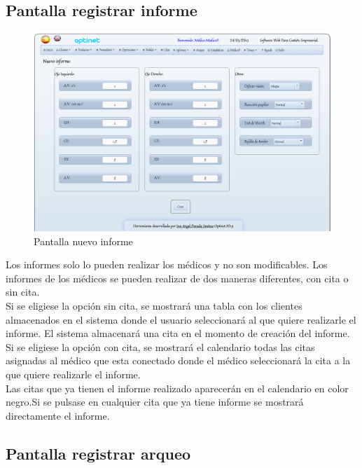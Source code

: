 \documentclass[a4paper,11pt]{book}
\begin{document}
\newpage
\subsection{Pantalla registrar informe}
\begin{figure}[!htb]
  \centering
    \includegraphics[scale=0.35]{capregistrarinforme.png}
  \caption{Pantalla nuevo informe}
  \label{a}
\end{figure}

Los informes solo lo pueden realizar los médicos y no son modificables. Los informes de los médicos se pueden realizar de dos maneras diferentes, con cita o sin cita.\\
 Si se eligiese la opción sin cita, se mostrará una tabla con los clientes almacenados en el sistema donde el usuario seleccionará al que quiere realizarle el informe. El sistema almacenará una cita en el momento de creación del informe.\\
Si se eligiese la opción con cita, se mostrará el calendario todas las citas asignadas al médico que esta conectado donde el médico seleccionará la cita a la que quiere realizarle el informe.\\

Las citas que ya tienen el informe realizado aparecerán en el calendario en color negro.Si se pulsase en cualquier cita que ya tiene informe se mostrará directamente el informe.

\newpage
\subsection {Pantalla registrar arqueo}
\end{document}
